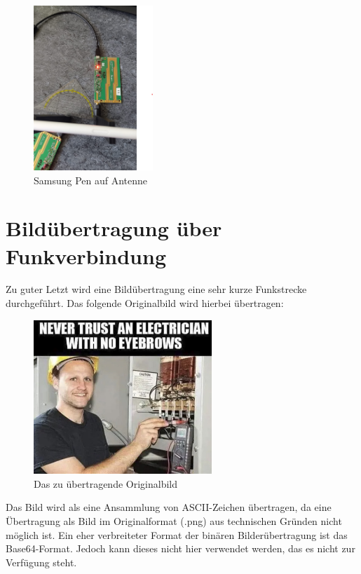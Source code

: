 \begin{figure}[H]
    \centering
    \includegraphics[width=0.4\textwidth]{Pictures/stift.png}
    \caption{Samsung Pen auf Antenne}
\end{figure}



\section{Bildübertragung über Funkverbindung}
Zu guter Letzt wird eine Bildübertragung eine sehr kurze Funkstrecke durchgeführt. Das folgende Originalbild wird hierbei übertragen:
\begin{figure}[H]
    \centering
    \includegraphics[width=0.6\textwidth]{Pictures/meme.jpg}
    \caption{Das zu übertragende Originalbild}
    \label{fig:Task2b}
\end{figure}

Das Bild wird als eine Ansammlung von ASCII-Zeichen übertragen, da eine Übertragung als Bild im Originalformat (.png) aus technischen Gründen nicht möglich ist.
Ein eher verbreiteter Format der binären Bilderübertragung ist das Base64-Format. Jedoch kann dieses nicht hier verwendet werden, das es nicht zur Verfügung steht.

